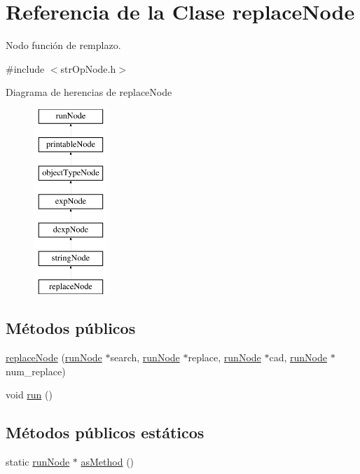 \hypertarget{classreplaceNode}{\section{Referencia de la Clase replace\-Node}
\label{classreplaceNode}
}


Nodo función de remplazo.  




{\ttfamily \#include $<$str\-Op\-Node.\-h$>$}

Diagrama de herencias de replace\-Node\begin{figure}[H]
\begin{center}
\leavevmode
\includegraphics[height=7.000000cm]{classreplaceNode}
\end{center}
\end{figure}
\subsection*{Métodos públicos}
\begin{DoxyCompactItemize}
\item 
\hyperlink{classreplaceNode_a0a8599660f34e20c1dffdc4dba61ed84}{replace\-Node} (\hyperlink{classrunNode}{run\-Node} $\ast$search, \hyperlink{classrunNode}{run\-Node} $\ast$replace, \hyperlink{classrunNode}{run\-Node} $\ast$cad, \hyperlink{classrunNode}{run\-Node} $\ast$num\-\_\-replace)
\item 
void \hyperlink{classreplaceNode_a1bf20f6a4f26f339050837fce45ede44}{run} ()
\end{DoxyCompactItemize}
\subsection*{Métodos públicos estáticos}
\begin{DoxyCompactItemize}
\item 
static \hyperlink{classrunNode}{run\-Node} $\ast$ \hyperlink{classreplaceNode_aa464dc5a26255e2bf4792f751fb1cd35}{as\-Method} ()
\end{DoxyCompactItemize}
